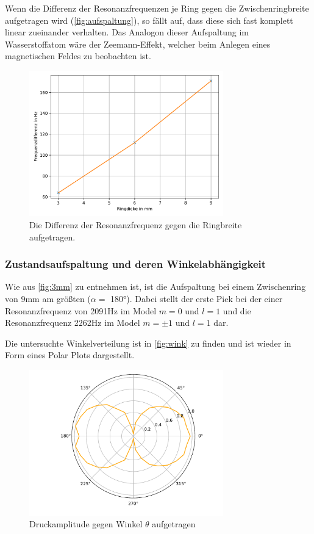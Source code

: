   \noindent
  Wenn die Differenz der Resonanzfrequenzen je Ring gegen die Zwischenringbreite aufgetragen wird (\autoref{fig:aufspaltung}), so fällt auf, dass diese sich fast komplett linear zueinander verhalten.
  Das Analogon dieser Aufspaltung im Wasserstoffatom wäre der Zeemann-Effekt, welcher beim Anlegen eines magnetischen Feldes zu beobachten ist.

\begin{figure}
  \centering
  \includegraphics[width=0.75\textwidth]{pic/aufspaltung.pdf}
  \caption{Die Differenz der Resonanzfrequenz gegen die Ringbreite aufgetragen.}
  \label{fig:aufspaltung}
\end{figure}



\subsubsection{Zustandsaufspaltung und deren Winkelabhängigkeit}
Wie aus \autoref{fig:3mm} zu entnehmen ist, ist die Aufspaltung bei einem Zwischenring von 9mm am größten ($\alpha = $ 180°). Dabei stellt der erste Piek bei der einer
Resonanzfrequenz von 2091Hz im Model $m=0$ und $l=1$ und die Resonanzfrequenz 2262Hz im Model $m= \pm 1$ und $l=1$ dar.

\noindent
Die untersuchte Winkelverteilung ist in \autoref{fig:wink} zu finden und ist wieder in Form eines Polar Plots dargestellt.


\begin{figure}
    \centering
    \includegraphics[width=0.75\textwidth]{pic/polar_9mm.pdf}
    \caption{Druckamplitude gegen Winkel $\theta$ aufgetragen}
    \label{fig:wink}
  \end{figure}
  
